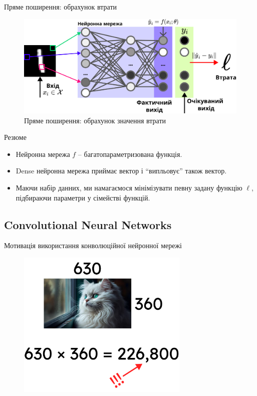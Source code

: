 \documentclass{zkdl-presentation-template}
\begin{document}
    \begin{frame}{Пряме поширення: обрахунок втрати}

    \begin{figure}
        \centering
        \includegraphics[width=\textwidth]{images/full_forward_prop.png}
        \caption{Пряме поширення: обрахунок значення втрати}
    \end{figure}

    \end{frame}

    \begin{frame}{Резюме}
        \begin{itemize}
            \item Нейронна мережа $f$ -- багатопараметризована функція.
            \item Dense нейронна мережа приймає вектор і ``випльовує'' також вектор.
            \item Маючи набір данних, ми намагаємося мінімізувати певну задану функцію $\ell$, підбираючи параметри у сімействі функцій.
        \end{itemize}    
	\end{frame}

    \subsection{Convolutional Neural Networks}
	\begin{frame}{Мотивація використання конволюційної нейронної мережі}
	    \begin{figure}
        \centering
            \includegraphics[width=0.73\textwidth]{images/cnn_motivation.png}
        \end{figure}
	\end{frame}
\end{document}
